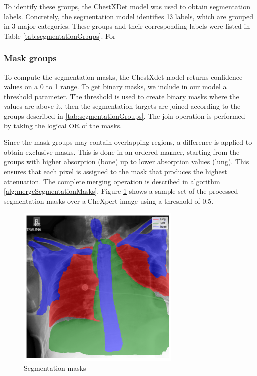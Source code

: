 \documentclass[nomenclature, english, bibtex]{kththesis}
\numberwithin{listing}{chapter}
\begin{document}
To identify these groups, the ChestXDet \cite{chestxdet} model was used to obtain segmentation labels.
Concretely, the segmentation model identifies 13 labels, which are grouped in 3 major categories.
These groups and their corresponding labels were listed in Table \ref{tab:segmentationGroups}.
For
\subsubsection{Mask groups}

To compute the segmentation masks, the ChestXdet model returns confidence values on a 0 to 1 range.
To get binary masks, we include in our model a threshold parameter. The threshold is used to create binary masks where
the values are above it, then the segmentation targets are joined according to the groups described in
\autoref{tab:segmentationGroups}. The join operation is performed by taking the logical
OR of the masks.

Since the mask groups may contain overlapping regions, a difference is applied to obtain exclusive masks. This is done in an ordered manner,
starting from the groups with higher absorption (bone) up to lower absorption values (lung). This ensures that each pixel is assigned to
the mask that produces the highest attenuation. The complete merging operation is described in algorithm \ref{alg:mergeSegmentationMasks}. Figure
\ref{fig:segmentationMasks} shows a sample set of the processed segmentation masks over a CheXpert image using a threshold of 0.5.


\begin{figure}[H]
    \centering
    \includegraphics[width=0.7\textwidth]{figures/segmentation_masks.png}
    \caption{Segmentation masks}
    \label{fig:segmentationMasks}
\end{figure}
\end{document}
